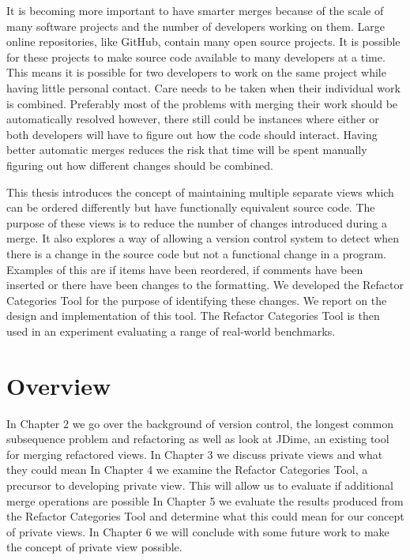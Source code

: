 It is becoming more important to have smarter merges because of the scale of many software projects and the number of developers working on them.
Large online repositories, like GitHub, contain many open source projects.
It is possible for these projects to make source code available to many developers at a time.
This means it is possible for two developers to work on the same project while having little personal contact.
Care needs to be taken when their individual work is combined.
Preferably most of the problems with merging their work should be automatically resolved however,
there still could be instances where either or both developers will have to figure out how the code should interact.
Having better automatic merges reduces the risk that time will be spent manually figuring out how different changes should be combined.

This thesis introduces the concept of maintaining multiple separate views which can be ordered differently but have functionally equivalent source code.
The purpose of these views is to reduce the number of changes introduced during a merge. 
It also explores a way of allowing a version control system to detect when there is a change in the source code but not a functional change in a program.
Examples of this are if items have been reordered, if comments have been inserted or there have been changes to the formatting. 
We developed the Refactor Categories Tool for the purpose of identifying these changes. 
We report on the design and implementation of this tool.
The Refactor Categories Tool is then used in an experiment evaluating a range of real-world benchmarks.


% 
 

\section{Overview}
In Chapter 2 we go over the background of version control, the longest common subsequence problem and refactoring as well as look at JDime, an existing tool for merging refactored views.
In Chapter 3 we discuss private views and what they could mean
In Chapter 4 we examine the Refactor Categories Tool, a precursor to developing private view. This will allow us to evaluate if additional merge operations are possible
In Chapter 5 we evaluate the results produced from the Refactor Categories Tool and determine what this could mean for our concept of private views.
In Chapter 6 we will conclude with some future work to make the concept of private view possible. 

